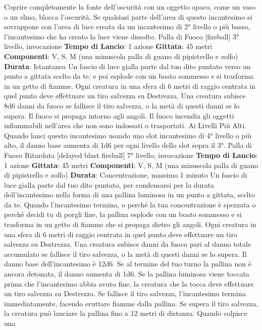 \begin{multicols}{2}
Coprire completamente la fonte dell’oscurità con un
oggetto opaco, come un vaso o un elmo, blocca
l’oscurità.
Se qualsiasi parte dell’area di questo incantesimo si
sovrappone con l’area di luce creata da un incantesimo
di 2° livello o più basso, l’incantesimo che ha creato la
luce viene dissolto.
Palla di Fuoco
[fireball]
3° livello, invocazione
\textbf{Tempo di Lancio}: 1 azione
\textbf{Gittata}: 45 metri
\textbf{Componenti}: V, S, M (una minuscola palla di guano di
pipistrello e zolfo)
\textbf{Durata}: Istantanea
Un fascio di luce gialla parte dal tuo dito puntato verso
un punto a gittata scelto da te, e poi esplode con un
boato sommesso e si trasforma in un getto di fiamme.
Ogni creatura in una sfera di 6 metri di raggio centrata
in quel punto deve effettuare un tiro salvezza su
Destrezza. Una creatura subisce 8d6 danni da fuoco se
fallisce il tiro salvezza, o la metà di questi danni se lo
supera.
Il fuoco si propaga intorno agli angoli. Il fuoco incendia
gli oggetti infiammabili nell’area che non sono indossati
o trasportati.
Ai Livelli Più Alti. Quando lanci questo incantesimo
usando uno slot incantesimo di 4° livello o più alto, il
danno base aumenta di 1d6 per ogni livello dello slot
sopra il 3°.
Palla di Fuoco Ritardata
[delayed blast fireball]
7° livello, invocazione
\textbf{Tempo di Lancio}: 1 azione
\textbf{Gittata}: 45 metri
\textbf{Componenti}: V, S, M (una minuscola palla di guano di
pipistrello e zolfo)
\textbf{Durata}: Concentrazione, massimo 1 minuto
Un fascio di luce gialla parte dal tuo dito puntato, per
condensarsi per la durata dell’incantesimo nella forma
di una pallina luminosa in un punto a gittata, scelto da
te. Quando l’incantesimo termina, o perché la tua
concentrazione è spezzata o perché decidi tu di porgli
fine, la pallina esplode con un boato sommesso e si
trasforma in un getto di fiamme che si propaga dietro gli
angoli. Ogni creatura in una sfera di 6 metri di raggio
centrata in quel punto deve effettuare un tiro salvezza
su Destrezza. Una creatura subisce danni da fuoco pari
al danno totale accumulato se fallisce il tiro salvezza, o
la metà di questi danni se lo supera.
Il danno base dell’incantesimo è 12d6. Se al termine del
tuo turno la pallina non è ancora detonata, il danno
aumenta di 1d6.
Se la pallina luminosa viene toccata prima che
l’incantesimo abbia avuto fine, la creatura che la tocca
deve effettuare un tiro salvezza su Destrezza. Se
fallisce il tiro salvezza, l’incantesimo termina
immediatamente, facendo eruttare fiamme dalla pallina.
Se supera il tiro salvezza, la creatura può lanciare la
pallina fino a 12 metri di distanza. Quando colpisce una

\end{multicols}
